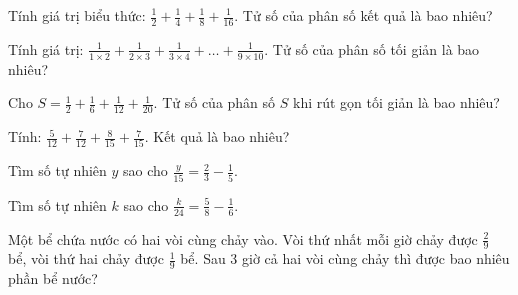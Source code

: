 \begin{ex}
  Tính giá trị biểu thức: $\frac{1}{2} + \frac{1}{4} + \frac{1}{8} + \frac{1}{16}$. Tử số của phân số kết quả là bao nhiêu?
\end{ex}

\begin{ex}
  Tính giá trị: $\frac{1}{1 \times 2} + \frac{1}{2 \times 3} + \frac{1}{3 \times 4} + \dots + \frac{1}{9 \times 10}$. Tử số của phân số tối giản là bao nhiêu?
\end{ex}

\begin{ex}
  Cho $S = \frac{1}{2} + \frac{1}{6} + \frac{1}{12} + \frac{1}{20}$. Tử số của phân số $S$ khi rút gọn tối giản là bao nhiêu?
\end{ex}

\begin{ex}
  Tính: $\frac{5}{12} + \frac{7}{12} + \frac{8}{15} + \frac{7}{15}$. Kết quả là bao nhiêu?
\end{ex}

\begin{ex}
  Tìm số tự nhiên $y$ sao cho $\frac{y}{15} = \frac{2}{3} - \frac{1}{5}$.
\end{ex}

\begin{ex}
  Tìm số tự nhiên $k$ sao cho $\frac{k}{24} = \frac{5}{8} - \frac{1}{6}$.
\end{ex}

\begin{ex}
  Một bể chứa nước có hai vòi cùng chảy vào. Vòi thứ nhất mỗi giờ chảy được $\frac{2}{9}$ bể, vòi thứ hai chảy được $\frac{1}{9}$ bể. Sau 3 giờ cả hai vòi cùng chảy thì được bao nhiêu phần bể nước?
\end{ex}

